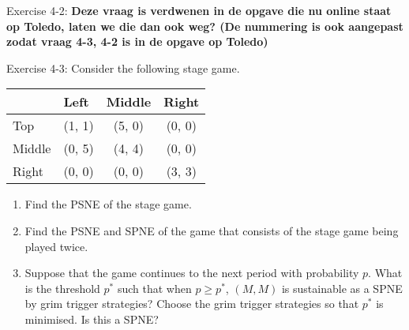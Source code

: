 \documentclass[../main.tex]{subfiles}
\begin{document}
\begin{question}
Exercise 4-2: \textbf{Deze vraag is verdwenen in de opgave die nu online staat op Toledo, laten we die dan ook weg? (De nummering is ook aangepast zodat vraag 4-3, 4-2 is in de opgave op Toledo)}
\end{question}

\begin{solution}
\end{solution}

\begin{question}

Exercise 4-3: Consider the following stage game.
\begin{table}[h]
\centering
\begin{tabular}{lccc}
                            & \multicolumn{1}{l}{Left} & \multicolumn{1}{l}{Middle} & \multicolumn{1}{l}{Right} \\ \hline
\multicolumn{1}{l|}{Top}    & (1, 1)                   & (5, 0)                     & (0, 0)                    \\
\multicolumn{1}{l|}{Middle} & (0, 5)                   & (4, 4)                     & (0, 0)                    \\
\multicolumn{1}{l|}{Right}  & (0, 0)                   & (0, 0)                     & (3, 3)                   
\end{tabular}
\end{table}

\begin{enumerate}
  \item Find the PSNE of the stage game.
  \item Find the PSNE and SPNE of the game that consists of the stage game being played twice.
  \item Suppose that the game continues to the next period with probability $p$. What is the threshold $p^*$ such that when $p \geq p^*$, $(M,M)$ is sustainable as a SPNE by grim trigger strategies? Choose the grim trigger strategies so that $p^*$ is minimised. Is this a SPNE?
\end{enumerate}

\end{question}
\end{document}
